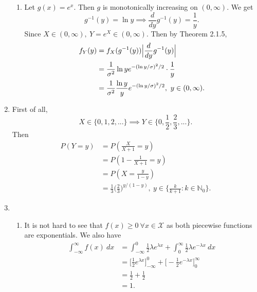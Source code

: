 \documentclass{article}
\begin{document}
\begin{enumerate}
\begin{enumerate}
        \item Let $g(x) = e^{x}$. Then $g$ is monotonically increasing on $(0, \infty)$. We get 
        \[
        g^{-1}(y) = \ln{y} \implies \frac{d}{dy}g^{-1}(y) = \frac{1}{y}.
        \]
        Since $X \in (0, \infty), \ Y = e^{X} \in (0, \infty)$. Then by Theorem 2.1.5, 
        \begin{align*}
            f_{Y}(y)
            &= f_{X}(g^{-1}(y)) \Bigl|\frac{d}{dy}g^{-1}(y)\Bigr| \\
            &= \frac{1}{\sigma^2} \ln{y} e^{-(\ln{y}/\sigma)^2 /2} \cdot \frac{1}{y} \\
            &= \frac{1}{\sigma^2} \frac{\ln{y}}{y} e^{-(\ln{y}/\sigma)^2 / 2}, \ y \in (0, \infty).
        \end{align*}
    \end{enumerate}

    \item First of all, 
    \[ X \in \{0, 1, 2, ...\} \implies Y \in \Big\{0, \frac{1}{2}, \frac{2}{3}, ...\Big\}. \]
    Then
    \begin{align*}
        P(Y = y) 
        &= P(\frac{X}{X + 1} = y) \\
        &= P(1 - \frac{1}{X + 1} = y) \\
        &= P(X = \frac{y}{1 - y}) \\
        &= \frac{1}{3} \Big( \frac{2}{3} \Big)^{y / (1 - y)}, \ y \in \Big\{\frac{k}{k + 1}: k \in \mathbb{N}_0 \Big\}.
    \end{align*}
    
    \item \begin{enumerate}
        \item It is not hard to see that $f(x) \geq 0 \ \forall x \in \mathcal{X}$ as both piecewise functions are 
        exponentials. We also have 
        \begin{align*}
            \int_{-\infty}^{\infty} f(x) \ dx 
            &= \int_{-\infty}^{0} \frac{1}{2}\lambda e^{\lambda x} 
            + \int_{0}^{\infty} \frac{1}{2}\lambda e^{-\lambda x} \ dx \\
            &= \Big[\frac{1}{2}e^{\lambda x} \Big]_{-\infty}^{0} + \Big[ -\frac{1}{2}e^{-\lambda x} \Big]_{0}^{\infty} \\
            &= \frac{1}{2} + \frac{1}{2} \\
            &= 1.
        \end{align*}


\end{enumerate}
\end{enumerate}
\end{document}
